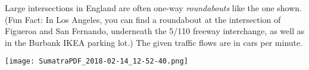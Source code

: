 \documentclass[12pt, letterpaper]{exam}
\begin{document}
\begin{questions}
\newpage
\begin{q}{12} %
	Large intersections in England are often one-way \emph{roundabouts} like the one shown. (Fun Fact: In Los Angeles, you can find a roundabout at the intersection of Figueroa and San Fernando, underneath the 5/110 freeway interchange, as well as in the Burbank IKEA parking lot.) The given traffic flows are in cars per minute.
	\texttt{[image: SumatraPDF\_2018-02-14\_12-52-40.png]}
\end{q}

\end{questions}
\end{document}
